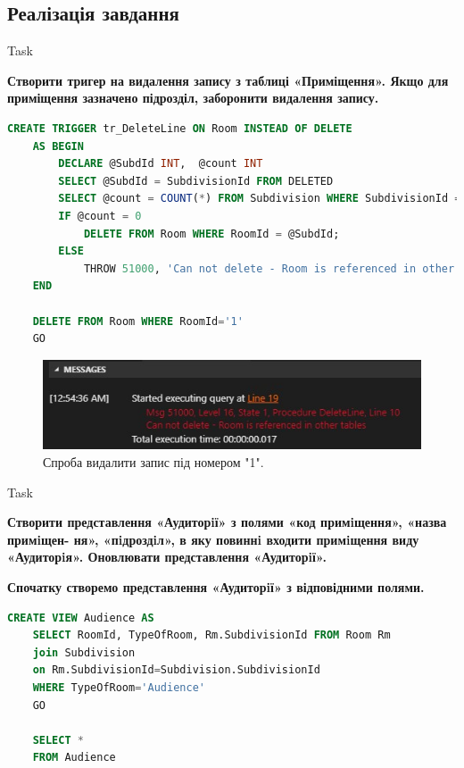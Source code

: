 \documentclass[a4paper,12pt]{article}
\newcommand{\RomanNumeralCaps}[1]{\MakeUppercase{\romannumeral #1}}
\begin{document}
\newpage
	\begin{center}
		\section*{\bfseries{Реалізація завдання}}
	\end{center}
    \begin{center}
        \Large{Task \RomanNumeralCaps{1}}
    \end{center}
    \textbf{Створити тригер на видалення запису з таблиці «Приміщення». Якщо для приміщення зазначено підрозділ, заборонити видалення запису.}
	\begin{lstlisting}[language=SQL]
	CREATE TRIGGER tr_DeleteLine ON Room INSTEAD OF DELETE
	AS BEGIN
		DECLARE @SubdId INT,  @count INT
		SELECT @SubdId = SubdivisionId FROM DELETED
		SELECT @count = COUNT(*) FROM Subdivision WHERE SubdivisionId = @SubdId
		IF @count = 0
			DELETE FROM Room WHERE RoomId = @SubdId;
		ELSE
			THROW 51000, 'Can not delete - Room is referenced in other tables', 1;
	END
		
	DELETE FROM Room WHERE RoomId='1'
	GO
	\end{lstlisting}
	\begin{figure}[h!]
		\begin{minipage}[h]{1\linewidth}
			\centering
			\includegraphics[width=0.6\linewidth]{Prt sc/Figure_1.jpg}  
		\end{minipage}
		\caption{Спроба видалити запис під номером "1".}
	\end{figure}
	
	\begin{center}
        \Large{Task \RomanNumeralCaps{2}}
    \end{center}
	\textbf{Створити представлення «Аудиторiї» з полями «код примiщення», «назва примiщен-
	ня», «пiдроздiл», в яку повиннi входити примiщення виду «Аудиторiя». Оновлювати
	представлення «Аудиторiї».} 
	\begin{center}
		\textbf{Спочатку створемо представлення «Аудиторiї» з відповідними полями.}
	\end{center}
	\begin{lstlisting}[language=SQL]
	CREATE VIEW Audience AS
	SELECT RoomId, TypeOfRoom, Rm.SubdivisionId FROM Room Rm
	join Subdivision
	on Rm.SubdivisionId=Subdivision.SubdivisionId
	WHERE TypeOfRoom='Audience'
	GO
	
	SELECT *
	FROM Audience
	\end{lstlisting}
\end{document}
